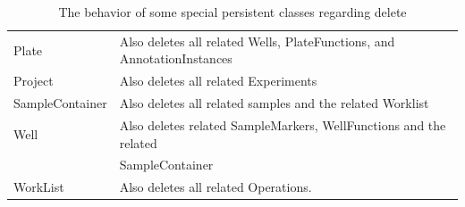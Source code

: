 \documentclass[a4paper,10pt]{article}
\begin{document}
\begin{table}[hbt]
\begin{center}
\begin{tabular}{|l|l|}
                Plate       & Also deletes all related Wells, PlateFunctions,
                              and  AnnotationInstances \\
                              
                Project     & Also deletes all related Experiments \\
                
                SampleContainer & Also deletes all related samples and the
                                  related  Worklist \\
                                  
                Well        & Also deletes related SampleMarkers, 
                              WellFunctions and the related\\
                            & SampleContainer \\
                            
                WorkList    & Also deletes all related Operations. \\
                \hline
        \end{tabular}
        \end{center}
        \label{deleting}
        \caption{The behavior of some special persistent classes regarding
                 delete}
    \end{table}
	
\end{document}
